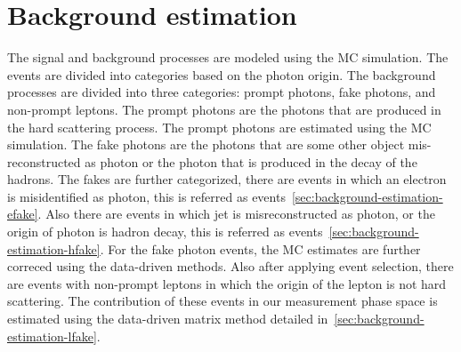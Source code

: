 \chapter{Background estimation}
\label{chap:background_estimation}

The signal and background processes are modeled using the MC simulation. The events are divided into categories based on the photon origin. The background processes are divided into three categories: prompt photons, fake photons, and non-prompt leptons. The prompt photons are the photons that are produced in the hard scattering process. The prompt photons are estimated using the MC simulation. The fake photons are the photons that are some other object mis-reconstructed as photon or the photon that is produced in the decay of the hadrons. The fakes are further categorized, there are events in which an electron is misidentified as photon, this is referred as \efake events~\cref{sec:background-estimation-efake}. Also there are events in which jet is misreconstructed as photon, or the origin of photon is hadron decay, this is referred as \hfake events~\cref{sec:background-estimation-hfake}. For the fake photon events, the MC estimates are further correced using the data-driven methods.  Also after applying event selection, there are events with non-prompt leptons in which the origin of the lepton is not hard scattering. The contribution of these events in our measurement phase space is estimated using the data-driven matrix method detailed in~\cref{sec:background-estimation-lfake}.




